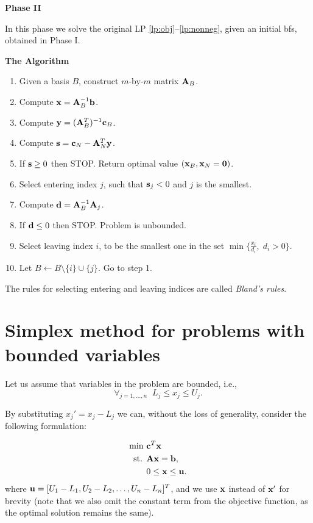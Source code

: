 \documentclass[10pt]{article}
\begin{document}
\medskip
{\bf Phase II}

In this phase we solve the original LP \eqref{lp:obj}--\eqref{lp:nonneg}, given an initial bfs, obtained in Phase I.

\medskip
{\bf The Algorithm}
\begin{enumerate}
    \item Given a basis $B$, construct $m$-by-$m$ matrix ${\bf A}_B$.
    \item Compute ${\bf x} = {\bf A}_B^{-1} {\bf b}$.
    \item Compute ${\bf y} = ({\bf A}_B^T)^{-1} {\bf c}_B$.
    \item Compute ${\bf s} = {\bf c}_N - {\bf A}_N^T {\bf y}$.
    \item If ${\bf s} \geq 0$ then STOP. Return optimal value $({\bf x}_B, {\bf x}_N = {\bf 0})$.
    \item Select entering index $j$, such that ${\bf s}_j < 0$ and $j$ is the smallest.
    \item Compute ${\bf d} = {\bf A}_B^{-1} {\bf A}_j$. 
    \item If ${\bf d} \leq 0$ then STOP. Problem is unbounded.
    \item Select leaving index $i$, to be the smallest one in the set $\min \{ \frac{x_i}{d_i}, \; d_i > 0 \}$.
    \item Let $B \leftarrow B \setminus \{ i \} \cup \{ j \}$. Go to step 1.
\end{enumerate}

The rules for selecting entering and leaving indices are called {\em Bland's rules}.

\section*{Simplex method for problems with bounded variables}

Let us assume that variables in the problem are bounded, i.e.,
$$
    \forall_{j=1,\ldots,n} \;\; L_j \leq x_j \leq U_j.
$$

By substituting $x_j' = x_j - L_j$ we can, without the loss of generality, consider the following formulation:

\begin{align}
    \textrm{min } & {\bf c}^T {\bf x} \label{lp:obj_sub} \\
    \textrm{st. } & {\bf A} {\bf x} = {\bf b}, \label{lp:Axeqb_sub} \\
                  & 0 \leq {\bf x} \leq {\bf u}. \label{lp:bounds}
\end{align}
where ${\bf u} = [U_1 - L_1, U_2 - L_2, \ldots, U_n - L_n]^T$, and we use ${\bf x}$ instead of ${\bf x}'$ for brevity (note that we also omit the constant term from the objective function, as the optimal solution remains the same).
\end{document}
